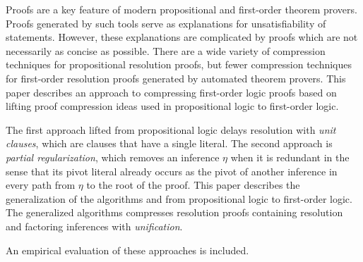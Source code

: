 Proofs are a key feature of modern propositional and first-order theorem provers. 
Proofs generated by such tools serve as explanations for unsatisfiability of statements. 
However, these explanations are complicated by proofs which are not necessarily as concise as possible.
There are a wide variety of compression techniques for propositional resolution proofs, but fewer compression techniques for first-order resolution proofs generated by automated theorem provers.
This paper describes an approach to compressing first-order logic proofs based on lifting proof compression ideas used in propositional logic to first-order logic. 

The first approach lifted from propositional logic delays resolution with \emph{unit clauses}, which are clauses that have a single literal.
The second approach is \emph{partial regularization}, which removes an inference $\eta$ when it is redundant in the sense that its pivot literal already occurs as the pivot of another inference in every path from $\eta$ to the root of the proof. 
This paper describes the generalization of the algorithms \LowerUnits and \RecyclePivotsIntersection \cite{LURPI} %
from propositional logic to first-order logic. 
The generalized algorithms compresses resolution proofs containing resolution and factoring inferences with \emph{unification}.

An empirical evaluation of these approaches is included.


